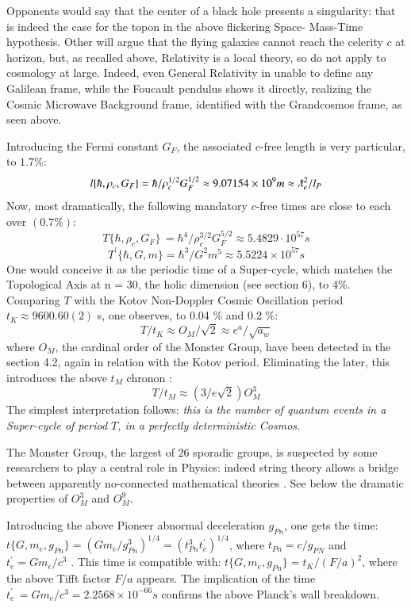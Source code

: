 \documentclass[twoside,draft]{article}
\begin{document}
\begin{sloppypar}
Opponents would say that the
center of a black hole presents a singularity: that is indeed the case for the topon in the above flickering Space-
Mass-Time hypothesis. Other will argue that the flying galaxies cannot reach the celerity $c$ at
horizon, but, as recalled above, Relativity is a local theory, so do not apply to cosmology at large.
Indeed, even General Relativity in unable to define any Galilean frame, while the Foucault
pendulus shows it directly, realizing the Cosmic Microwave Background frame, identified with the
Grandcosmos frame, as seen above.

Introducing the Fermi constant $G_{F}$, the associated $c$-free length is very particular, to $1.7\%$:
$$l\{\hbar,\rho_{c},G_{F}\} = \hbar/\rho_{c}^{1/2} G_{F}^{1/2} \approx 9.07154 \times 10^{9} m \approx \lambdabar_{e}^{2}/l_{P}$$
Now, most dramatically, the following mandatory $c$-free times are close to each over $(0.7\%)$:
\begin{equation}
T\{\hbar,\rho_{c} ,G_{F} \}\, = \hbar^{4} /\rho_{c}^{3/2} G_{F}^{5/2} \approx 5.4829 \cdot 10^{57} s
\end{equation}
\begin{equation}
T^{\prime}\{\hbar,G,m\} = \hbar^{3} /G^{2} m^{5} \approx 5.5224 \times 10^{57} s
\end{equation}
One would conceive it as the periodic time of a Super-cycle, which matches the Topological Axis at n = 30,
the holic dimension (see section 6), to 4\%. Comparing $T$ with the Kotov Non-Doppler Cosmic
Oscillation period $t_{K} \approx 9600.60(2)$ s, one observes, to 0.04 \% and 0.2 \%:
$$T/t_{K} \approx O_{M} /\sqrt{2} \approx e^a / \sqrt{a_w} $$
where $O_{M}$, the cardinal order of the Monster Group, have been detected in the section 4.2, again in relation with the Kotov period. Eliminating the later, this introduces the above $t_M$ chronon :
\begin{equation}
T/t_M \approx (3/e\sqrt{2})O_M^3
\end{equation}
The simplest interpretation follows: \textit{this is the number of quantum events in a Super-cycle of period $T$, in a perfectly deterministic Cosmos}. 

The  Monster  Group,  the largest of 26 sporadic groups, is suspected by some researchers to play a central role in Physics: indeed string theory allows a bridge between apparently no-connected mathematical theories \cite{Borcherds}. See below the dramatic properties of $O_M^3$ and $O_M^9$.

Introducing the above Pioneer abnormal deceleration $g_{Pn}$, one gets the time: 
$
t\{G, m_{e} , g_{Pn} \} = (Gm_{e} /g_{Pn}^{3} )^{1/4} = (t_{Pn}^{3} t^{\prime}_{e} )^{1/4}
$, where $t_{Pn} = c/g_{PN}$ and $t^{\prime}_{e} = Gm_{e} /c^{3}$ . This time is compatible with:
$
t\{G, m_{e} , g_{Pn} \} = t_{K} /(F/a)^{2}
$, where the above Tifft factor $F/a$ appears. The implication of the time 
$t^{\prime}_{e}\, = Gm_{e} /c^{3} = 2.2568 \times 10^{-66} s$
confirms the above Planck's wall breakdown.


\end{sloppypar}
\end{document}
